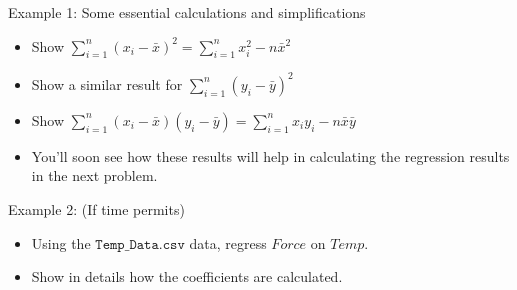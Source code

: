 \documentclass{beamer}
\begin{document}
	\begin{frame}{Example 1: Some essential calculations and simplifications}
		\begin{itemize}
			\item Show $\sum_{i=1}^n (x_i-\bar{x})^2 = \sum_{i=1}^n x_i^2- n\bar{x}^2$
			\item Show a similar result for $\sum_{i=1}^n (y_i-\bar{y})^2$
			\item Show $\sum_{i=1}^n (x_i-\bar{x})(y_i-\bar{y}) = \sum_{i=1}^n x_iy_i- n\bar{x}\bar{y}$
			\item You'll soon see how these results will help in calculating the regression results in the next problem.
		\end{itemize}
	\end{frame}
	
	
	\begin{frame}{Example 2: (If time permits)}
		\begin{itemize}
			\item Using the $\mathtt{Temp\_Data.csv}$ data, regress $Force$ on $Temp$.
			\item Show in details how the coefficients are calculated.
		\end{itemize}
	\end{frame}
	
\end{document}
